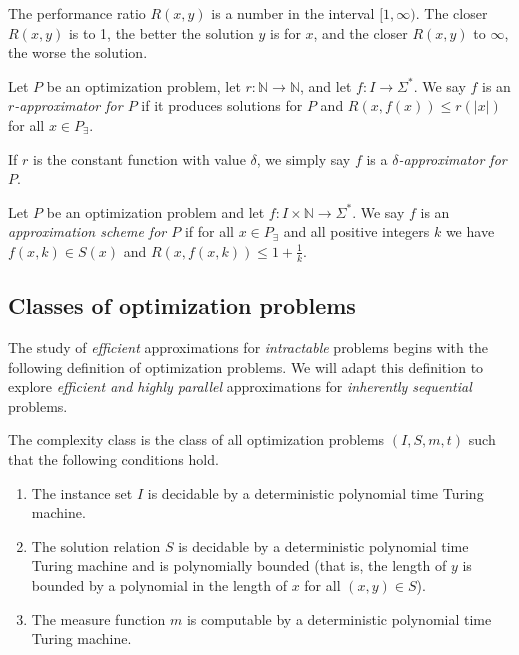 \documentclass[]{article}
\begin{document}
The performance ratio $R(x, y)$ is a number in the interval $[1, \infty)$.
The closer $R(x, y)$ is to 1, the better the solution $y$ is for $x$, and the closer $R(x, y)$ to $\infty$, the worse the solution.

\begin{definition}
  Let $P$ be an optimization problem, let $r\colon \mathbb{N}\to\mathbb{N}$, and let $f\colon I\to \Sigma^*$.
  We say $f$ is an \emph{$r$-approximator for $P$} if it produces solutions for $P$ and $R(x, f(x)) \leq r(|x|)$ for all $x\in P_\exists$.

  If $r$ is the constant function with value $\delta$, we simply say $f$ is a \emph{$\delta$-approximator for $P$}.
\end{definition}

\begin{definition}
  Let $P$ be an optimization problem and let $f\colon I\times\mathbb{N}\to\Sigma^*$.
  We say $f$ is an \emph{approximation scheme for $P$} if for all $x\in P_\exists$ and all positive integers $k$ we have $f(x, k)\in S(x)$ and $R(x, f(x, k)) \leq 1 + \frac{1}{k}$.
\end{definition}

\subsection{Classes of optimization problems}

The study of \emph{efficient} approximations for \emph{intractable} problems begins with the following definition of \NP{} optimization problems.
We will adapt this definition to explore \emph{efficient and highly parallel} approximations for \emph{inherently sequential} problems.

\begin{definition}\label{def:npo}
  The complexity class \NPO{} is the class of all optimization problems $(I, S, m, t)$ such that the following conditions hold.
  \begin{enumerate}
  \item The instance set $I$ is decidable by a deterministic polynomial time Turing machine.
  \item The solution relation $S$ is decidable by a deterministic polynomial time Turing machine and is polynomially bounded (that is, the length of $y$ is bounded by a polynomial in the length of $x$ for all $(x, y)\in S$).
  \item The measure function $m$ is computable by a deterministic polynomial time Turing machine.
  \end{enumerate}
\end{definition}
\end{document}
